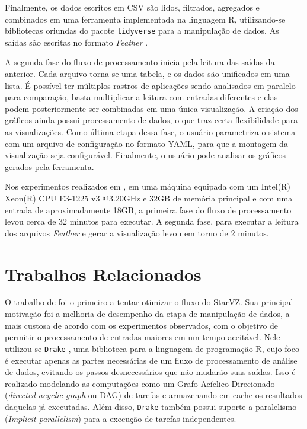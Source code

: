 Finalmente, os dados escritos em CSV são lidos, filtrados, agregados e 
combinados em uma ferramenta implementada na linguagem R, utilizando-se 
bibliotecas oriundas do pacote \texttt{tidyverse} para a manipulação de dados. 
As saídas são escritas no formato \emph{Feather} \cite{ref:feather}.

A segunda fase do fluxo de processamento inicia pela leitura das saídas da 
anterior. Cada arquivo torna-se uma tabela, e os dados são unificados em uma 
lista. É possível ter múltiplos rastros de aplicações sendo analisados em 
paralelo para comparação, basta multiplicar a leitura com entradas diferentes e 
elas podem posteriormente ser combinadas em uma única visualização. A criação 
dos gráficos ainda possui processamento de dados, o que traz certa flexibilidade 
para as visualizações. Como última etapa dessa fase, o usuário parametriza o 
sistema com um arquivo de configuração no formato YAML, para que a montagem da 
visualização seja configurável. Finalmente, o usuário pode analisar os gráficos 
gerados pela ferramenta.

Nos experimentos realizados em \citet{ref:starvz}, em uma máquina equipada com 
um Intel(R) Xeon(R) CPU E3-1225 v3 @3.20GHz e 32GB de memória principal e com 
uma entrada de aproximadamente 18GB, a primeira fase do fluxo de processamento 
levou cerca de 32 minutos para executar. A segunda fase, para executar a leitura 
dos arquivos \emph{Feather} e gerar a visualização levou em torno de 2 minutos.

\section{Trabalhos Relacionados}\label{sect:related-work}

O trabalho de \citet{ref:drakestarvz} foi o primeiro a tentar otimizar o fluxo 
do StarVZ. Sua principal motivação foi a melhoria de desempenho da etapa de 
manipulação de dados, a mais custosa de acordo com os experimentos observados, 
com o objetivo de permitir o processamento de entradas maiores em um tempo 
aceitável. Nele utilizou-se \texttt{Drake} \cite{ref:drake}, uma biblioteca 
para a linguagem de programação R, cujo foco é executar apenas as 
partes necessárias de um fluxo de processamento de análise de dados, evitando 
os passos desnecessários que não mudarão suas saídas. Isso é realizado 
modelando as computações como um Grafo Acíclico Direcionado (\emph{directed 
acyclic graph} ou DAG) de tarefas e armazenando em cache os resultados daquelas 
já executadas. Além disso, \texttt{Drake} também possui suporte a paralelismo 
(\emph{Implicit parallelism}) para a execução de tarefas independentes.

